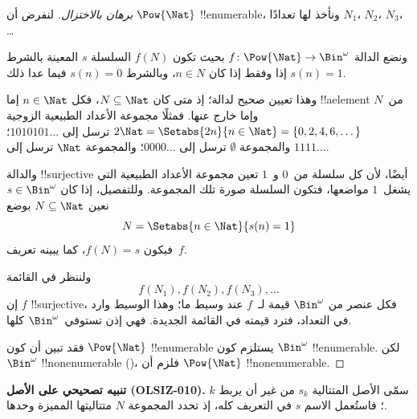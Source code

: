 \documentclass[../../../include/open-logic-section]{subfiles}
\begin{document}
\begin{proof}[برهان {} بالاختزال]
لنفرض أن $\Pow{\Nat}$ !!{enumerable}، ونأخذ لها تعدادًا $N_{1}$، $N_{2}$، $N_{3}$، \dots

ونضع الدالة $f \colon \Pow{\Nat} \to \Bin^\omega$ بحيث تكون $f(N)$ السلسلة $s$ المعينة بالشرط $s(n) = 1$ إذا وفقط إذا كان $n \in N$، وبالشرط $s(n) = 0$ فيما عدا ذلك.

وهذا تعيين صحيح لدالة؛ إذ متى كان $N \subseteq \Nat$، فكل $n \in \Nat$ إما !!a{element} من~$N$ وإما خارج عنها. فمثلًا مجموعة الأعداد الطبيعية الزوجية $2\Nat = \Setabs{2n}{n \in \Nat} = \{0,2, 4, 6,
\dots\}$ ترسل إلى $1010101\dots$؛ والمجموعة $\emptyset$ ترسل إلى $0000\dots$؛ والمجموعة $\Nat$ ترسل إلى $1111\dots$.

والدالة !!{surjective} أيضًا، لأن كل سلسلة من~$0$ و~$1$ تعين مجموعة الأعداد الطبيعية التي يشغل~$1$ مواضعها، فتكون السلسلة صورة تلك المجموعة. وللتفصيل، إذا كان $s \in \Bin^\omega$ نعين $N
\subseteq \Nat$ بوضع
\[
N = \Setabs{n \in \Nat}{s(n) = 1}
\]
فيكون $f(N) = s$، كما يبينه تعريف~$f$.

ولننظر في القائمة
\[
f(N_1), f(N_2), f(N_3), \dots
\]
إن $f$ !!{surjective}، فكل عنصر من $\Bin^\omega$ قيمة لـ~$f$ عند وسيط ما؛ وهذا الوسيط وارد في التعداد، فترد قيمته في القائمة الجديدة. فهي إذن تستوفي~$\Bin^\omega$ كلها.

فقد تبين أن كون $\Pow{\Nat}$ !!{enumerable} يستلزم كون $\Bin^\omega$ !!{enumerable}. لكن $\Bin^\omega$ !!{nonenumerable} ()، فلزم أن $\Pow{\Nat}$ !!{nonenumerable}.
\end{proof}

\begin{editorial}
\textbf{تنبيه تصحيحي على الأصل (OLSIZ-010).}
سمّى الأصل المتتالية $s_k$ من غير أن يربط $k$؛ فاستُعمل الاسم
$s$ في التعريف كله، إذ تحدد المجموعة $N$ متتاليتها المميزة وحدها.
\end{editorial}

\end{document}
